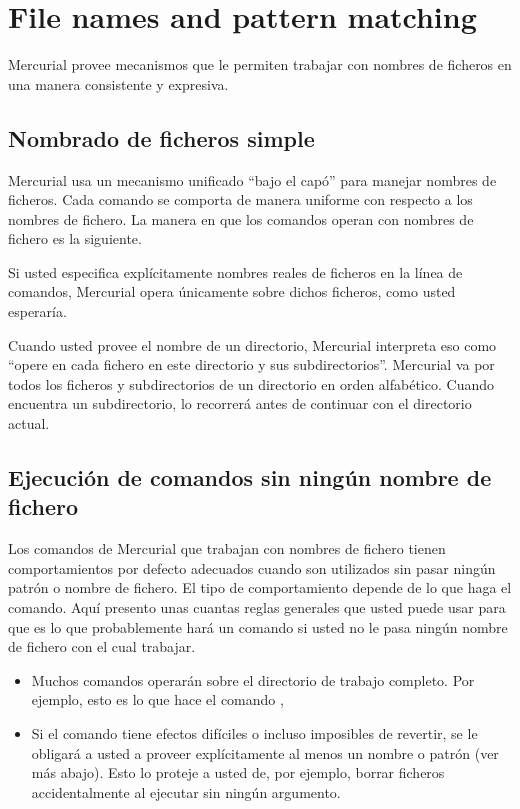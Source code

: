 \chapter{File names and pattern matching}
\label{chap:names}

Mercurial provee mecanismos que le permiten trabajar con nombres de
ficheros en una manera consistente y expresiva.

\section{Nombrado de ficheros simple}

Mercurial usa un mecanismo unificado ``bajo el capó'' para manejar
nombres de ficheros. Cada comando se comporta de manera uniforme con
respecto a los nombres de fichero. La manera en que los comandos
operan con nombres de fichero es la siguiente.

Si usted especifica explícitamente nombres reales de ficheros en la
línea de comandos, Mercurial opera únicamente sobre dichos ficheros,
como usted esperaría.

Cuando usted provee el nombre de un directorio, Mercurial interpreta
eso como ``opere en cada fichero en este directorio y sus
subdirectorios''. Mercurial va por todos los ficheros y subdirectorios
de un directorio en orden alfabético. Cuando encuentra un
subdirectorio, lo recorrerá antes de continuar con el directorio
actual.

\section{Ejecución de comandos sin ningún nombre de fichero}

Los comandos de Mercurial que trabajan con nombres de fichero tienen
comportamientos por defecto adecuados cuando son utilizados sin pasar
ningún patrón o nombre de fichero. El tipo de comportamiento depende
de lo que haga el comando. Aquí presento unas cuantas reglas generales
que usted puede usar para que es lo que probablemente hará un comando
si usted no le pasa ningún nombre de fichero con el cual trabajar.
\begin{itemize}
\item Muchos comandos operarán sobre el directorio de trabajo
    completo. Por ejemplo, esto es lo que hace el comando
    ,
\item Si el comando tiene efectos difíciles o incluso imposibles de
    revertir, se le obligará a usted a proveer explícitamente al menos
    un nombre o patrón (ver más abajo). Esto lo proteje a usted de,
    por ejemplo, borrar ficheros accidentalmente al ejecutar
     sin ningún argumento.
\end{itemize}


